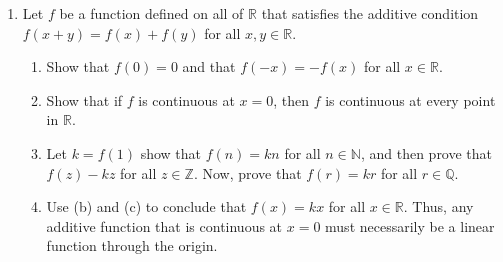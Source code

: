 \begin{enumerate}
\begin{proof}
\begin{enumerate}
            \item Choose \( x \in \mathbb{R} \) and let the sequence \( (x_{n}) \) be defined by \( x_{n+1} = f(x_{n}) \). Then choosing \( N \in \mathbb{N} \) so that \( c^{N} < \frac{\epsilon}{\vert y-x \vert} \) implies that for all \( n > N \) we have
            \begin{align*}
                \vert y_{n} - x_{n} \vert &< c \vert y_{n-1} - x_{n-1} \vert \\
                &\vdots \\
                &< c^{n-1} \vert y-x \vert \\
                &< \frac{\epsilon}{\vert y-x \vert} \vert y-x \vert \\
                &= \epsilon
            \end{align*}
            implying that \( \lim x_{n} = \lim y_{n} = y \). 
        \end{enumerate}
        \end{proof}
        
        \item Let \( f \) be a function defined on all of \( \mathbb{R} \) that satisfies the additive condition \( f(x+y) = f(x) + f(y) \) for all \( x,y \in \mathbb{R} \).
        \begin{enumerate}
            \item Show that \( f(0) = 0 \) and that \( f(-x) = -f(x) \) for all \( x \in \mathbb{R} \).
            \item Show that if \( f \) is continuous at \( x=0 \), then \( f \) is continuous at every point in \( \mathbb{R} \).
            \item Let \( k = f(1) \) show that \( f(n) = kn \) for all \( n \in \mathbb{N} \), and then prove that \( f(z) - kz \) for all \( z \in \mathbb{Z} \). Now, prove that \( f(r) = kr \) for all \( r \in \mathbb{Q} \).
            \item Use (b) and (c) to conclude that \( f(x) = kx \) for all \( x \in \mathbb{R} \). Thus, any additive function that is continuous at \( x=0 \) must necessarily be a linear function through the origin.
        \end{enumerate}
        

\end{enumerate}
